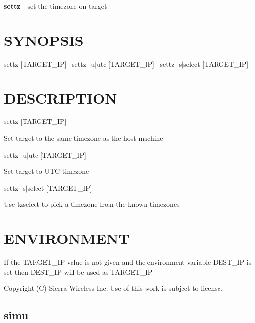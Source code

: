 {\bfseries settz} -\/ set the timezone on target

\section*{S\+Y\+N\+O\+P\+S\+I\+S}

{\ttfamily settz \mbox{[}T\+A\+R\+G\+E\+T\+\_\+\+I\+P\mbox{]}}~\newline
 {\ttfamily settz -\/u$\vert$utc \mbox{[}T\+A\+R\+G\+E\+T\+\_\+\+I\+P\mbox{]}}~\newline
 {\ttfamily settz -\/s$\vert$select \mbox{[}T\+A\+R\+G\+E\+T\+\_\+\+I\+P\mbox{]}}~\newline


\section*{D\+E\+S\+C\+R\+I\+P\+T\+I\+O\+N}

settz \mbox{[}T\+A\+R\+G\+E\+T\+\_\+\+I\+P\mbox{]}
\begin{DoxyItemize}
\item Set target to the same timezone as the host machine
\end{DoxyItemize}

settz -\/u$\vert$utc \mbox{[}T\+A\+R\+G\+E\+T\+\_\+\+I\+P\mbox{]}
\begin{DoxyItemize}
\item Set target to U\+T\+C timezone
\end{DoxyItemize}

settz -\/s$\vert$select \mbox{[}T\+A\+R\+G\+E\+T\+\_\+\+I\+P\mbox{]}
\begin{DoxyItemize}
\item Use tzselect to pick a timezone from the known timezones
\end{DoxyItemize}

\section*{E\+N\+V\+I\+R\+O\+N\+M\+E\+N\+T}

\begin{DoxyVerb}If the TARGET_IP value is not given and the environment variable DEST_IP
is set then DEST_IP will be used as TARGET_IP
\end{DoxyVerb}




 Copyright (C) Sierra Wireless Inc. Use of this work is subject to license. \hypertarget{toolsHost_simu}{}\subsection{simu}\label{toolsHost_simu}

